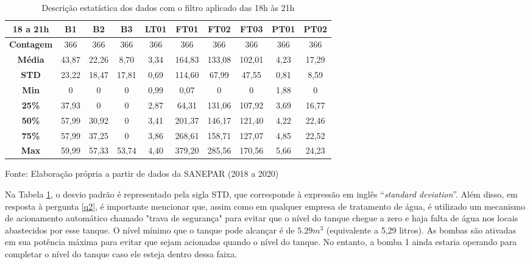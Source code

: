 \begin{table}[H]
	\centering
	\caption{Descrição estatística dos dados com o filtro aplicado das 18h às 21h}\label{tb:est}
	\begin{tabular}{@{}cccccccccc@{}}
		\toprule
		\textbf{18 a 21h}  & \textbf{B1} & \textbf{B2} & \textbf{B3} & \textbf{LT01} & \textbf{FT01} & \textbf{FT02} & \textbf{FT03} & \textbf{PT01} & \textbf{PT02} \\ \midrule
		\textbf{Contagem} & 366         & 366         & 366         & 366           & 366           & 366           & 366           & 366           & 366           \\
		\textbf{Média}    & 43,87       & 22,26       & 8,70        & 3,34          & 164,83        & 133,08        & 102,01        & 4,23          & 17,29         \\
		\textbf{STD}      & 23,22       & 18,47       & 17,81       & 0,69          & 114,60        & 67,99         & 47,55         & 0,81          & 8,59          \\
		\textbf{Min}      & 0           & 0           & 0           & 0,99          & 0,07          & 0             & 0             & 1,88          & 0             \\
		\textbf{25\%}     & 37,93       & 0           & 0           & 2,87          & 64,31         & 131,06        & 107,92        & 3,69          & 16,77         \\
		\textbf{50\%}     & 57,99       & 30,92       & 0           & 3,41          & 201,37        & 146,17        & 121,40        & 4,22          & 22,46         \\
		\textbf{75\%}     & 57,99       & 37,25       & 0           & 3,86          & 268,61        & 158,71        & 127,07        & 4,85          & 22,52         \\
		\textbf{Max}      & 59,99       & 57,33       & 53,74       & 4,40          & 379,20        & 285,56        & 170,56        & 5,66          & 24,23         \\ \bottomrule
	\end{tabular}
	
	Fonte: Elaboração própria a partir de dados da SANEPAR (2018 a 2020)
\end{table}

Na Tabela \ref{tb:est}, o desvio padrão é representado pela sigla STD, que corresponde à expressão em inglês ``\textit{standard deviation}''. Além disso, em resposta à pergunta \ref{q2}, é importante mencionar que, assim como em qualquer empresa de tratamento de água, é utilizado um mecanismo de acionamento automático chamado "trava de segurança" para evitar que o nível do tanque chegue a zero e haja falta de água nos locais abastecidos por esse tanque. O nível mínimo que o tanque pode alcançar é de $5.29 m^3$ (equivalente a 5,29 litros). As bombas são ativadas em sua potência máxima para evitar que sejam acionadas quando o nível do tanque. No entanto, a bomba 1 ainda estaria operando para completar o nível do tanque caso ele esteja dentro dessa faixa.

